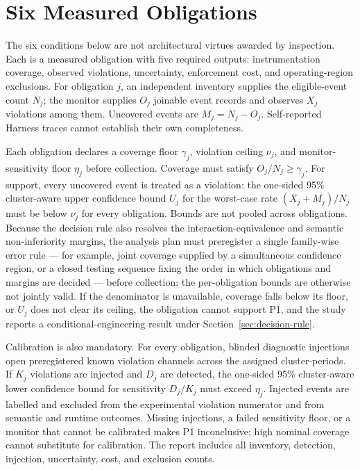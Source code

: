 \documentclass[11pt]{article}
\begin{document}
\section{Six Measured Obligations}
\label{sec:obligations}

The six conditions below are not architectural virtues awarded by inspection. Each is a measured obligation with five required outputs: instrumentation coverage, observed violations, uncertainty, enforcement cost, and operating-region exclusions. For obligation $j$, an independent inventory supplies the eligible-event count $N_j$; the monitor supplies $O_j$ joinable event records and observes $X_j$ violations among them. Uncovered events are $M_j=N_j-O_j$. Self-reported Harness traces cannot establish their own completeness.

Each obligation declares a coverage floor $\gamma_j$, violation ceiling $\nu_j$, and monitor-sensitivity floor $\eta_j$ before collection. Coverage must satisfy $O_j/N_j\geq\gamma_j$. For support, every uncovered event is treated as a violation: the one-sided 95\% cluster-aware upper confidence bound $U_j$ for the worst-case rate $(X_j+M_j)/N_j$ must be below $\nu_j$ for every obligation. Bounds are not pooled across obligations. Because the decision rule also resolves the interaction-equivalence and semantic non-inferiority margins, the analysis plan must preregister a single family-wise error rule --- for example, joint coverage supplied by a simultaneous confidence region, or a closed testing sequence fixing the order in which obligations and margins are decided --- before collection; the per-obligation bounds are otherwise not jointly valid. If the denominator is unavailable, coverage falls below its floor, or $U_j$ does not clear its ceiling, the obligation cannot support P1, and the study reports a conditional-engineering result under Section~\ref{sec:decision-rule}.

Calibration is also mandatory. For every obligation, blinded diagnostic injections open preregistered known violation channels across the assigned cluster-periods. If $K_j$ violations are injected and $D_j$ are detected, the one-sided 95\% cluster-aware lower confidence bound for sensitivity $D_j/K_j$ must exceed $\eta_j$. Injected events are labelled and excluded from the experimental violation numerator and from semantic and runtime outcomes. Missing injections, a failed sensitivity floor, or a monitor that cannot be calibrated makes P1 inconclusive; high nominal coverage cannot substitute for calibration. The report includes all inventory, detection, injection, uncertainty, cost, and exclusion counts.
\end{document}
